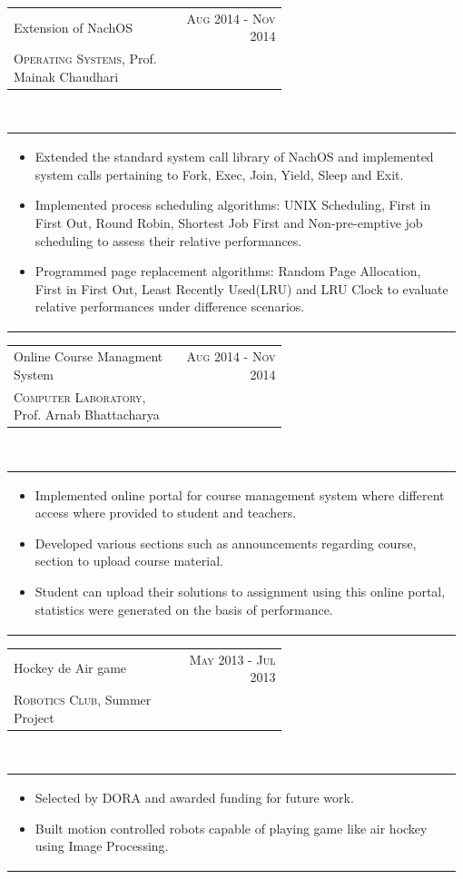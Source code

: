 \documentclass[a4paper]{article} %
\newcommand{\verticalspacing}{-0.05cm}
\newcommand{\bulletspace}{0.7cm}
\newcommand{\projectheadspacing}{6.9cm}
\newcommand{\cproject}[5]{%
    \begin{tabular}{p{0.60\linewidth}r}
        \textcolor{NavyBlue}{\small #2} & \multicolumn{1}{m{ \projectheadspacing{} }}{\raggedleft \small {\textsc{#1}}}\\
        \small {#3} & \small {#4}
    \end{tabular}\\
    \begin{tabular}{p{0.98\linewidth}}
    \vspace{-0.3cm}
        \small{#5}
    \end{tabular}
    \vspace{\verticalspacing{}}
}
\begin{document}
\cproject
    {Aug 2014 - Nov 2014}
    {Extension of NachOS}
    {\textsc{Operating Systems}, Prof. Mainak Chaudhari}
    {}
    {%
        \begin{itemize}[leftmargin=\bulletspace{}]
            \item Extended the standard system call library of NachOS and implemented system calls pertaining to Fork, Exec, Join, Yield, Sleep and Exit.
            \item Implemented process scheduling algorithms: UNIX Scheduling, First in First Out,
                Round Robin, Shortest Job First and Non-pre-emptive job scheduling to assess their relative performances.
            \item Programmed page replacement algorithms: Random Page Allocation, First in First Out,
                Least Recently Used(LRU) and LRU Clock to evaluate relative performances under difference scenarios.
        \end{itemize}
    }


\cproject
    {Aug 2014 - Nov 2014}
    {Online Course Managment System}
    {\textsc{Computer Laboratory}, Prof. Arnab Bhattacharya}
    {}
    {%
        \begin{itemize}[leftmargin=\bulletspace{}]
            \item Implemented online portal for course management system where different access where provided to student and teachers.
            \item Developed various sections such as announcements regarding course, section to upload course material.
            \item Student can upload their solutions to assignment using this online portal, statistics were generated on the basis of performance.
        \end{itemize}
    }

\cproject
    {May 2013 - Jul 2013 }
    {Hockey de Air game}
    {\textsc{Robotics Club}, Summer Project}
    {}
    {%
        \begin{itemize}[leftmargin=\bulletspace{}]
            \item Selected by DORA and awarded funding for future work.
            \item Built motion controlled robots capable of playing game like air hockey using Image Processing.
        \end{itemize}
    }

\end{document}
